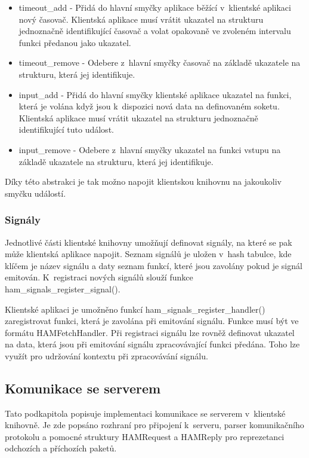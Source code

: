 \begin{itemize}
\item timeout\_add - Přidá do hlavní smyčky aplikace běžící v~klientské aplikaci
nový časovač. Klientská aplikace
musí vrátit ukazatel na strukturu jednoznačně identifikující časovač a
volat opakovaně ve zvoleném intervalu funkci předanou jako ukazatel.
\item timeout\_remove - Odebere z~hlavní smyčky časovač na základě ukazatele na strukturu, která jej identifikuje.
\item input\_add - Přidá do hlavní smyčky klientské aplikace ukazatel na funkci, která je volána když jsou k~dispozici
nová data na definovaném soketu. Klientská aplikace
musí vrátit ukazatel na strukturu jednoznačně identifikující tuto událost.
\item input\_remove - Odebere z~hlavní smyčky ukazatel na funkci vstupu na
základě ukazatele na strukturu, která jej identifikuje.
\end{itemize}

Díky této abstrakci je tak možno napojit klientskou knihovnu na jakoukoliv smyčku událostí.

\subsubsection{Signály}

Jednotlivé části klientské knihovny umožňují definovat signály, na které se pak může klientská aplikace napojit.
Seznam signálů je uložen v~hash tabulce, kde klíčem je název signálu a daty seznam funkcí, které jsou zavolány
pokud je signál emitován. K~registraci nových signálů slouží funkce ham\_signals\_register\_signal().

Klientské aplikaci je umožněno funkcí ham\_signals\_register\_handler() zaregistrovat funkci, která je zavolána
při emitování signálu. Funkce musí být ve formátu HAMFetchHandler. Při registraci signálu lze rovněž definovat
ukazatel na data, která jsou při emitování signálu zpracovávající funkci předána. Toho lze využít pro udržování
kontextu při zpracovávání signálu.


\subsection{Komunikace se serverem}

Tato podkapitola popisuje implementaci komunikace se serverem v~klientské knihovně. Je zde popsáno rozhraní pro
připojení k~serveru, parser komunikačního protokolu a pomocné struktury HAMRequest a HAMReply pro reprezetanci odchozích a
příchozích paketů.

